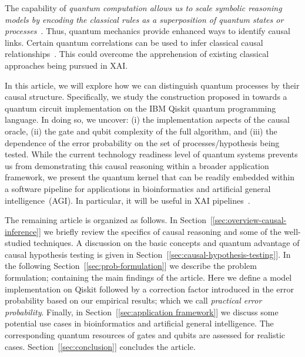 \documentclass[%
 aps,
 jmp,%
 amsmath,amssymb,
 reprint,%
]{revtex4-2}
\begin{document}
The capability of \textit{quantum computation allows us to scale symbolic reasoning models by encoding the classical rules as a superposition of quantum states or processes}~\cite{sarkar2021estimating}.
Thus, quantum mechanics provide enhanced ways to identify causal links.
Certain quantum correlations can be used to infer classical causal relationships~\cite{ried2015quantum,fitzsimons2015quantum}.
This could overcome the apprehension of existing classical approaches being pursued in XAI.

In this article, we will explore how we can distinguish quantum processes by their causal structure.
Specifically, we study the construction proposed in \cite{chiribella2019quantum} towards a quantum circuit implementation on the IBM Qiskit quantum programming language.
In doing so, we uncover: (i) the implementation aspects of the causal oracle, (ii) the gate and qubit complexity of the full algorithm, and (iii) the dependence of the error probability on the set of processes/hypothesis being tested.
While the current technology readiness level of quantum systems prevents us from demonstrating this causal reasoning within a broader application framework, we present the quantum kernel that can be readily embedded within a software pipeline for applications in bioinformatics and artificial general intelligence~(AGI).
In particular, it will be useful in XAI pipelines~\cite{lavin2021simulation,maruyama2021categorical}.

The remaining article is organized as follows. 
In {Section~[\ref{sec:overview-causal-inference}]} we briefly review the specifics of causal reasoning and some of the well-studied techniques. 
A discussion on the basic concepts and quantum advantage of causal hypothesis testing is given in {Section~[\ref{sec:causal-hypothesis-testing}]}. 
In the following {Section~[\ref{sec:prob-formulation}]} we describe the problem formulation; containing the main findings of the article. 
Here we define a model implementation on Qiskit followed by a correction factor introduced in the error probability based on our empirical results; which we call \textit{practical error probability}. 
Finally, in {Section~[\ref{sec:application framework}]} we discuss some potential use cases in bioinformatics and artificial general intelligence.
The corresponding quantum resources of gates and qubits are assessed for realistic cases.
{Section~[\ref{sec:conclusion}]} concludes the article.
\end{document}
